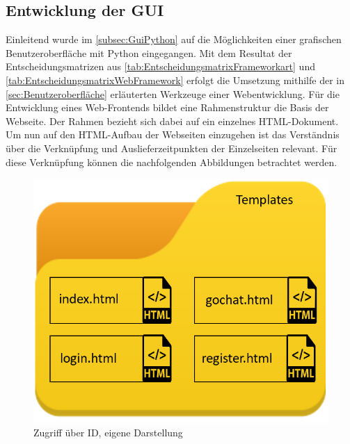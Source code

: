 \documentclass[a4paper,titlepage,halfparskip,12pt]{scrreprt}
\begin{document}
\begin{onehalfspacing}
\subsection{Entwicklung der GUI}
\label{subsec:EntwicklungGUI}
Einleitend wurde im \autoref{subsec:GuiPython} auf die Möglichkeiten einer grafischen Benutzeroberfläche mit Python eingegangen. Mit dem Resultat der Entscheidungsmatrizen aus \autoref{tab:EntscheidungsmatrixFrameworkart} und \autoref{tab:EntscheidungsmatrixWebFramework} erfolgt die Umsetzung mithilfe der in \autoref{sec:Benutzeroberfläche} erläuterten Werkzeuge einer Webentwicklung. Für die Entwicklung eines Web-Frontends %
bildet eine Rahmenstruktur die Basis der Webseite. Der Rahmen bezieht sich dabei auf ein einzelnes \ac{HTML}-Dokument. Um nun auf den \ac{HTML}-Aufbau der Webseiten einzugehen ist das Verständnis über die Verknüpfung und Auslieferzeitpunkten der Einzelseiten relevant. Für diese Verknüpfung können die nachfolgenden Abbildungen betrachtet werden.
\begin{figure}[h]
	\begin{minipage}[c]{.4\textwidth}
		\includegraphics[width=\textwidth]{images/HTMLDateienOrdner}
		\caption{Zugriff über ID, eigene Darstellung}
		\label{img:HTMLDateienOrdner}
	\end{minipage}
	\hspace{0.05\linewidth}%
	\begin{minipage}[c]{.4\textwidth}

\end{minipage}
\end{figure}
\end{onehalfspacing}
\end{document}
